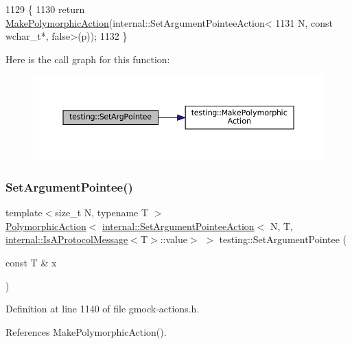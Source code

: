 \begin{DoxyCode}
1129                                 \{
1130   \textcolor{keywordflow}{return} \hyperlink{namespacetesting_a36bd06c5ea972c6df0bd9f40a7a94c65}{MakePolymorphicAction}(internal::SetArgumentPointeeAction<
1131       N, \textcolor{keyword}{const} \textcolor{keywordtype}{wchar\_t}*, \textcolor{keyword}{false}>(p));
1132 \}
\end{DoxyCode}
Here is the call graph for this function\+:
\nopagebreak
\begin{figure}[H]
\begin{center}
\leavevmode
\includegraphics[width=350pt]{namespacetesting_ac128085b4a8d64563fd5ccef324ea177_cgraph}
\end{center}
\end{figure}
\mbox{\label{namespacetesting_a03b315d27c91a8e719f2b6c09964130b}} 
\subsubsection{\texorpdfstring{Set\+Argument\+Pointee()}{SetArgumentPointee()}}
{\footnotesize\ttfamily template$<$size\+\_\+t N, typename T $>$ \\
\hyperlink{classtesting_1_1PolymorphicAction}{Polymorphic\+Action}$<$ \hyperlink{classtesting_1_1internal_1_1SetArgumentPointeeAction}{internal\+::\+Set\+Argument\+Pointee\+Action}$<$ N, T, \hyperlink{structtesting_1_1internal_1_1IsAProtocolMessage}{internal\+::\+Is\+A\+Protocol\+Message}$<$T$>$\+::value$>$ $>$ testing\+::\+Set\+Argument\+Pointee (\begin{DoxyParamCaption}\item[{const T \&}]{x }\end{DoxyParamCaption})}



Definition at line 1140 of file gmock-\/actions.\+h.



References Make\+Polymorphic\+Action().


